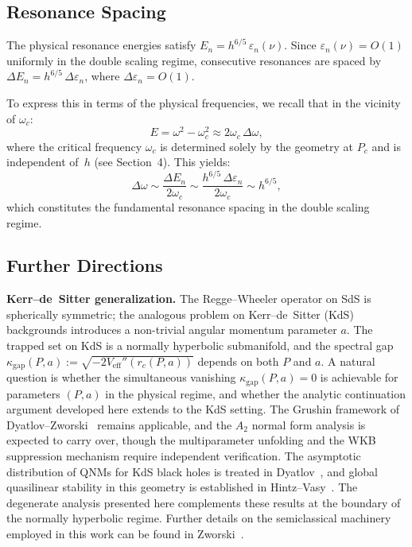 \documentclass[12pt,a4paper]{amsart}
\theoremstyle{remark}
\begin{document}
\subsection{Resonance Spacing}

The physical resonance energies satisfy $E_n = h^{6/5}\,\varepsilon_n(\nu)$.
Since $\varepsilon_n(\nu) = O(1)$ uniformly in the double scaling regime, consecutive
resonances are spaced by $\Delta E_n = h^{6/5}\,\Delta\varepsilon_n$, where
$\Delta\varepsilon_n = O(1)$.

To express this in terms of the physical frequencies, we recall that in the vicinity of $\omega_c$:
\[
  E = \omega^2 - \omega_c^2 \approx 2\omega_c\,\Delta\omega,
\]
where the critical frequency $\omega_c$ is determined solely by the geometry at $P_c$
and is independent of~$h$ (see Section~4).
This yields:
\[
  \Delta\omega \sim \frac{\Delta E_n}{2\omega_c}
  \sim \frac{h^{6/5}\,\Delta\varepsilon_n}{2\omega_c}
  \sim h^{6/5},
\]
which constitutes the fundamental resonance spacing in the double scaling regime.

\subsection*{Further Directions}

\textbf{Kerr--de~Sitter generalization.}
The Regge--Wheeler operator on SdS is spherically symmetric; the analogous problem
on Kerr--de~Sitter (KdS) backgrounds introduces a non-trivial angular momentum
parameter $a$. The trapped set on KdS is a normally hyperbolic submanifold,
and the spectral gap $\kappa_{\mathrm{gap}}(P,a) := \sqrt{-2V_{\mathrm{eff}}''(r_c(P,a))}$
depends on both $P$ and $a$.
A natural question is whether the simultaneous vanishing
$\kappa_{\mathrm{gap}}(P,a) = 0$ is achievable for parameters $(P,a)$ in the physical regime,
and whether the analytic continuation argument developed here extends to the KdS setting.
The Grushin framework of Dyatlov--Zworski~\cite{DZ19} remains applicable,
and the $A_2$ normal form analysis is expected to carry over, though the
multiparameter unfolding and the WKB suppression mechanism require
independent verification. The asymptotic distribution of QNMs for KdS black holes
is treated in Dyatlov~\cite{Dyatlov12}, and global quasilinear stability in this
geometry is established in Hintz--Vasy~\cite{HintzVasy2016}.
The degenerate analysis presented here complements these results at the boundary
of the normally hyperbolic regime. Further details on the semiclassical machinery
employed in this work can be found in Zworski~\cite{Zworski2012}.
\end{document}
